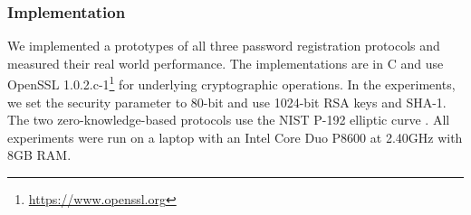 
\subsubsection{Implementation}
We implemented a prototypes of all three password registration protocols and measured their real world performance. 
The implementations are in C and use OpenSSL 1.0.2.c-1\footnote{\url{https://www.openssl.org}} for underlying cryptographic operations. 
In the experiments, we set the security parameter to 80-bit and use 1024-bit RSA keys and \mbox{{SHA-}1}. 
The two zero-knowledge-based protocols use the \ac{NIST} P-192 elliptic curve \cite{nistEC}.
All experiments were run on a laptop with an Intel Core Duo P8600 at 2.40GHz with 8GB RAM.

